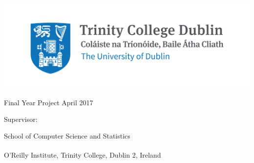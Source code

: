 \thispagestyle{empty}
\begin{center}
{\sffamily

\vspace{10pt}


\begin{center}
  \includegraphics[scale=1.25]{trinity-common-use.jpg}
  \label{fig:Prob1:MEA}
\end{center}


\vspace{70pt}

\textbf{ \Large \emph \projecttitle}

\vspace{30pt}

\authorname

\degreetitle

Final Year Project April 2017

Supervisor: \supervisorname

\vspace{70pt}

\large{School of Computer Science and Statistics
\\$ $\\
O'Reilly Institute, Trinity College, Dublin 2, Ireland}
\linespread{1}
}
\end{center}
